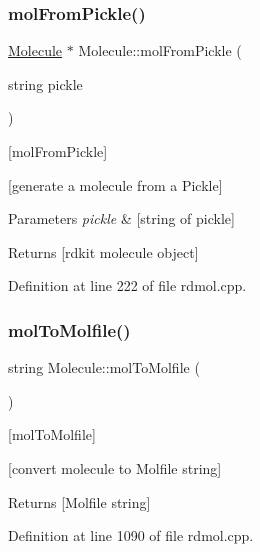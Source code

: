 \subsubsection{\texorpdfstring{mol\+From\+Pickle()}{molFromPickle()}}
{\footnotesize\ttfamily \mbox{\hyperlink{class_molecule}{Molecule}} $\ast$ Molecule\+::mol\+From\+Pickle (\begin{DoxyParamCaption}\item[{string}]{pickle }\end{DoxyParamCaption})\hspace{0.3cm}{\ttfamily [static]}}



\mbox{[}mol\+From\+Pickle\mbox{]} 

\mbox{[}generate a molecule from a Pickle\mbox{]}


\begin{DoxyParams}{Parameters}
{\em pickle} & \mbox{[}string of pickle\mbox{]} \\
\hline
\end{DoxyParams}
\begin{DoxyReturn}{Returns}
\mbox{[}rdkit molecule object\mbox{]} 
\end{DoxyReturn}


Definition at line 222 of file rdmol.\+cpp.

\mbox{\label{class_molecule_af03e0cbd53700d8fda8ed381184a75cc}} 
\subsubsection{\texorpdfstring{mol\+To\+Molfile()}{molToMolfile()}}
{\footnotesize\ttfamily string Molecule\+::mol\+To\+Molfile (\begin{DoxyParamCaption}{ }\end{DoxyParamCaption})}



\mbox{[}mol\+To\+Molfile\mbox{]} 

\mbox{[}convert molecule to Molfile string\mbox{]}

\begin{DoxyReturn}{Returns}
\mbox{[}Molfile string\mbox{]} 
\end{DoxyReturn}


Definition at line 1090 of file rdmol.\+cpp.

\mbox{\label{class_molecule_a9575c457c6fb3c38ac260b87434b5a37}} 
